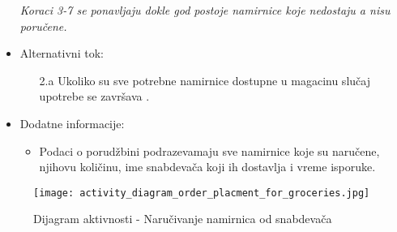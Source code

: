 \begin{itemize}
\begin{enumerate}
            
		\end{enumerate}
		\textit{Koraci 3-7 se ponavljaju dokle god postoje namirnice koje nedostaju a nisu poručene.}
	\item Alternativni tok:
		\begin{itemize}
		    \item[2.a] Ukoliko su sve potrebne namirnice dostupne u magacinu slučaj upotrebe se završava .
		 
		\end{itemize}
   \item Dodatne informacije:
		\begin{itemize}
		    \item Podaci o porudžbini podrazevamaju sve namirnice koje su naručene, njihovu količinu, ime snabdevača koji ih dostavlja i vreme isporuke.
	
		\end{itemize}
\end{itemize}

\begin{figure}[H]
\begin{center}
\texttt{[image: activity\_diagram\_order\_placment\_for\_groceries.jpg]}
\end{center}
    \caption{Dijagram aktivnosti - Naručivanje namirnica od snabdevača}
\label{fig:Activity_diagram_order_placment_for_groceries}
\end{figure}
